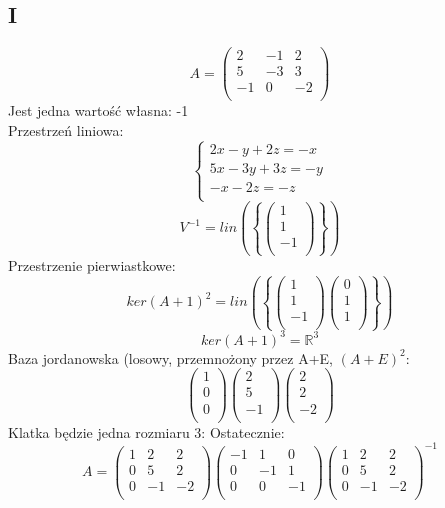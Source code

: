 \documentclass{article}
\begin{document}
\subsection*{I}
$$A=
\begin{pmatrix}
2 & -1 & 2\\
5 & -3 & 3\\
-1 & 0 & -2\\
\end{pmatrix}
$$
Jest jedna wartość własna: -1\\
Przestrzeń liniowa:
$$
\begin{cases}
2x - y + 2z = -x\\
5x - 3y + 3z = -y\\
-x - 2z = -z\\
\end{cases}
$$
$$
V^{-1} = lin(\left \{\begin{pmatrix}
 1\\
 1\\
-1\\
\end{pmatrix}\right\})
$$
Przestrzenie pierwiastkowe:
$$
ker(A+1)^2 = lin(\left \{\begin{pmatrix}
 1\\
 1\\
-1\\
\end{pmatrix}
\begin{pmatrix}
 0\\
 1\\
 1\\
\end{pmatrix}\right\})
$$
$$
ker(A+1)^3 = \mathbb{R}^3
$$
Baza jordanowska (losowy, przemnożony przez A+E, $(A+E)^2$:
$$
\begin{pmatrix}
 1\\
 0\\
 0\\
\end{pmatrix}
\begin{pmatrix}
 2\\
 5\\
 -1\\
\end{pmatrix}
\begin{pmatrix}
 2\\
 2\\
 -2\\
\end{pmatrix}
$$
Klatka będzie jedna rozmiaru 3:
Ostatecznie:
$$
A =
\begin{pmatrix}
 1 & 2 & 2\\
 0 & 5 & 2\\
 0 & -1 &-2\\
\end{pmatrix}
\begin{pmatrix}
 -1 & 1 & 0\\
 0 & -1 & 1\\
 0 & 0 &-1\\
\end{pmatrix}
\begin{pmatrix}
 1 & 2 & 2\\
 0 & 5 & 2\\
 0 & -1 &-2\\
\end{pmatrix}^{-1}
$$
\end{document}
